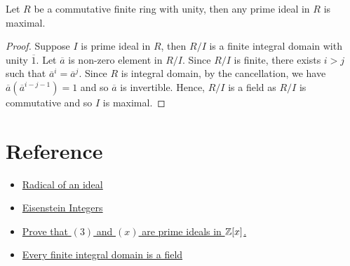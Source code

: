 \begin{exercise}{}{}
    Let $R$ be a commutative finite ring with unity, then any prime ideal in $R$ is maximal.
\end{exercise}

\begin{proof}
    Suppose $I$ is prime ideal in $R$, then $R/I$ is a finite integral domain with unity $\overline{1}$.
    Let $\overline{a}$ is non-zero element in $R/I$. Since $R/I$ is finite, there exists $i>j$ such that $\overline{a}^i=\overline{a}^j$.
    Since $R$ is integral domain, by the cancellation, we have $\overline{a}(\overline{a}^{i-j-1})=1$ and so $\overline{a}$ is invertible.
    Hence, $R/I$ is a field as $R/I$ is commutative and so $I$ is maximal.
\end{proof}

\section{Reference}

\begin{itemize}
    \item \href{https://en.wikipedia.org/wiki/Radical_of_an_ideal#cite_note-1}{Radical of an ideal}
    \item \href{https://www.cemc.uwaterloo.ca/events/mathcircles/2018-19/Fall/Senior_Nov14_Soln.pdf}{Eisenstein Integers}
    \item \href{https://www2.math.upenn.edu/~chai/371s10/371hws10/Math371HwSolns.pdf}{Prove that $(3)$ and $(x)$ are prime ideals in $\mathbb{Z}[x]$.}
    \item \href{https://www.math.umd.edu/~immortal/MATH403/lecturenotes/ch13.pdf}{Every finite integral domain is a field}
\end{itemize}